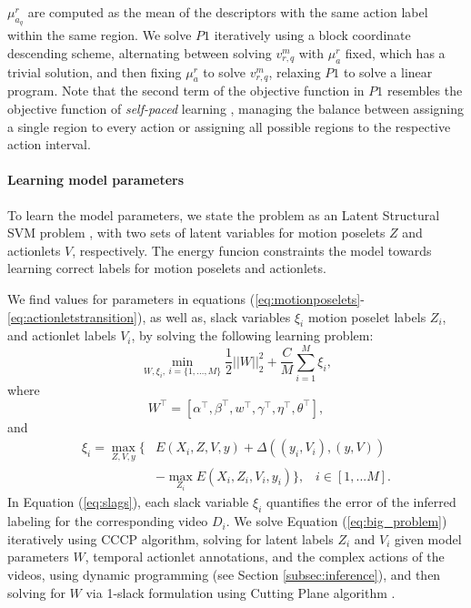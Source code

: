 $\mu_{a_q}^r$ are computed as the mean of the descriptors with the same action 
label within the same region. We solve $P1$ iteratively using a block coordinate 
descending scheme, alternating between solving $v_{r,q}^m$ with $\mu_{a}^r$ 
fixed, which has a trivial solution, and then fixing $\mu_{a}^r$ to solve 
$v_{r,q}^m$, relaxing $P1$ to solve a linear program. Note that the second term 
of the objective function in $P1$ resembles the objective function of 
\emph{self-paced} learning \cite{Kumar:EtAl:2010}, managing the balance between 
assigning a single region to every action or assigning all possible regions to 
the respective action interval.  

\paragraph{Learning model parameters}
To learn the model parameters, we state the problem as an Latent Structural SVM 
problem \cite{Yu:Joachims:2010}, with two sets of latent variables for motion 
poselets $Z$ and actionlets $V$, respectively. The energy funcion constraints 
the model towards learning correct labels for motion poselets and 
actionlets. 

We find values for parameters in equations 
(\ref{eq:motionposelets}-\ref{eq:actionletstransition}), as well as,
slack variables $\xi_i$ motion poselet labels $Z_i$, and actionlet labels $V_i$, 
by solving the following learning problem:
\begin{equation}
\label{eq:big_problem}
\min_{W,\xi_i,~i=\{1,\dots,M\}}    \frac{1}{2}||W||_2^2 + \frac{C}{M} \sum_{i=1}^M\xi_i ,
\end{equation}
where
\begin{equation}
W^\top=[\alpha^\top, \beta^\top, w^\top, \gamma^\top, \eta^\top, \theta^\top],
\end{equation}
and
\begin{equation} \label{eq:slags}
\begin{split}
\xi_i = \max_{Z,V,y}  \{  & E(X_i, Z, V, y) + \Delta( (y_i,V_i), (y, V)) \\
 & - \max_{Z_i}{ E(X_i, Z_i, V_i, y_i)} \}, \; \;\; i\in[1,...M].	
\end{split}
\end{equation}
In Equation (\ref{eq:slags}), each slack variable
$\xi_i$ quantifies the error of the inferred labeling for the corresponding 
video $D_i$. We solve Equation (\ref{eq:big_problem}) iteratively using CCCP 
algorithm, solving for latent labels $Z_i$ and $V_i$ given model parameters $W$, 
temporal actionlet annotations, and the complex actions of the videos, using 
dynamic programming (see Section \ref{subsec:inference}), and then solving for 
$W$ via 1-slack formulation using Cutting Plane algorithm 
\cite{Joachims2009}. 

